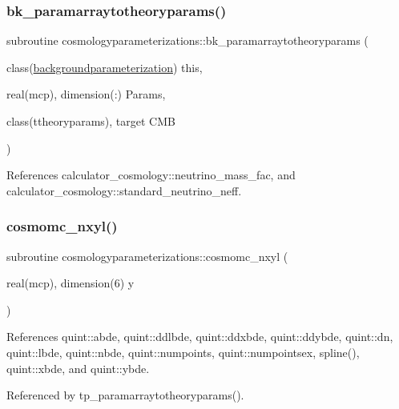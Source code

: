 \subsubsection{\texorpdfstring{bk\+\_\+paramarraytotheoryparams()}{bk\_paramarraytotheoryparams()}}
{\footnotesize\ttfamily subroutine cosmologyparameterizations\+::bk\+\_\+paramarraytotheoryparams (\begin{DoxyParamCaption}\item[{class(\mbox{\hyperlink{structcosmologyparameterizations_1_1backgroundparameterization}{backgroundparameterization}})}]{this,  }\item[{real(mcp), dimension(\+:)}]{Params,  }\item[{class(ttheoryparams), target}]{C\+MB }\end{DoxyParamCaption})\hspace{0.3cm}{\ttfamily [private]}}



References calculator\+\_\+cosmology\+::neutrino\+\_\+mass\+\_\+fac, and calculator\+\_\+cosmology\+::standard\+\_\+neutrino\+\_\+neff.

\mbox{\label{namespacecosmologyparameterizations_ae660404b993706170ddf14a2a0904812}} 
\subsubsection{\texorpdfstring{cosmomc\+\_\+nxyl()}{cosmomc\_nxyl()}}
{\footnotesize\ttfamily subroutine cosmologyparameterizations\+::cosmomc\+\_\+nxyl (\begin{DoxyParamCaption}\item[{real(mcp), dimension(6)}]{y }\end{DoxyParamCaption})}



References quint\+::abde, quint\+::ddlbde, quint\+::ddxbde, quint\+::ddybde, quint\+::dn, quint\+::lbde, quint\+::nbde, quint\+::numpoints, quint\+::numpointsex, spline(), quint\+::xbde, and quint\+::ybde.



Referenced by tp\+\_\+paramarraytotheoryparams().

